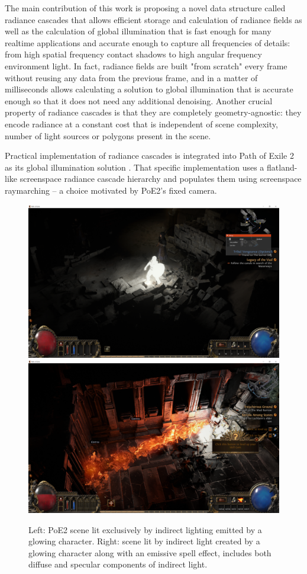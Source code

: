 \documentclass{jcgt}
\begin{document}
The main contribution of this work is proposing a novel data structure called radiance cascades that allows efficient storage and calculation of radiance fields as well as the calculation of global illumination that is fast enough for many realtime applications and accurate enough to capture all frequencies of details: from high spatial frequency contact shadows to high angular frequency environment light.
In fact, radiance fields are built "from scratch" every frame without reusing any data from the previous frame, and in a matter of milliseconds allows calculating a solution to global illumination
that is accurate enough so that it does not need any additional denoising. Another crucial property of radiance cascades is that they are completely geometry-agnostic: they encode radiance
at a constant cost that is independent of scene complexity, number of light sources or polygons present in the scene.

Practical implementation of radiance cascades is integrated into Path of Exile 2 as its global illumination solution . That specific implementation uses a flatland-like screenspace radiance cascade hierarchy and populates them using screenspace raymarching -- a choice motivated by PoE2's fixed camera.

\begin{figure}[htb]
  \centering
  \includegraphics[width=0.49\columnwidth]{images/ranger_gi.png}
  \includegraphics[width=0.49\columnwidth]{images/gi_with_specular.png}
  \caption{\label{fig:poe2gi}
     Left: PoE2 scene lit exclusively by indirect lighting emitted by a glowing character. Right: scene lit by indirect light created by a glowing character along with an emissive spell effect, includes both diffuse and specular components of indirect light.}
\end{figure}
\end{document}
